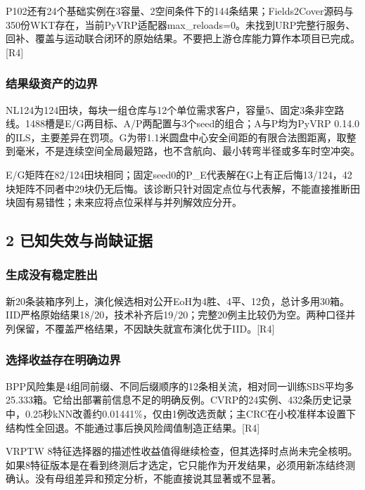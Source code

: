 \documentclass[11pt,a4paper]{article}
\newcommand{\bodytext}[1]{#1\par}
\begin{document}
\endgroup
\bodytext{P102还有24个基础实例在3容量、2空间条件下的144条结果；Fields2Cover源码与350份WKT存在，当前PyVRP适配器max\_\allowbreak{}reloads=0。未找到URP完整行服务、回补、覆盖与运动联合闭环的原始结果。不要把上游仓库能力算作本项目已完成。[R4]}
\subsubsection{结果级资产的边界}
\bodytext{NL124为124田块，每块一组仓库与12个单位需求客户，容量5、固定3条非空路线。1488槽是E/\allowbreak{}G两目标、A/\allowbreak{}P两配置与3个seed的组合；A与P均为PyVRP 0.14.0的ILS，主要差异在罚项。G为带1.1米圆盘中心安全间距的有限合法图距离，取整到毫米，不是连续空间全局最短路，也不含航向、最小转弯半径或多车时空冲突。}
\bodytext{E/\allowbreak{}G矩阵在82/\allowbreak{}124田块相同；固定seed0的P\_\allowbreak{}E代表解在G上有正后悔13/\allowbreak{}124，42块矩阵不同者中29块仍无后悔。该诊断只针对固定点位与代表解，不能直接推断田块固有易错性；未来应将点位采样与并列解效应分开。}
\subsection{2  已知失效与尚缺证据}
\subsubsection{生成没有稳定胜出}
\bodytext{新20条装箱序列上，演化候选相对公开EoH为4胜、4平、12负，总计多用30箱。IID严格原始结果18/\allowbreak{}20，技术补齐后19/\allowbreak{}20；完整20例主比较仍为空。两种口径并列保留，不覆盖严格结果，不因缺失就宣布演化优于IID。[R4]}
\subsubsection{选择收益存在明确边界}
\bodytext{BPP风险集是4组同前缀、不同后缀顺序的12条相关流，相对同一训练SBS平均多25.333箱。它给出部署前信息不足的明确反例。CVRP的24实例、432条历史记录中，0.25秒kNN改善约0.01441\%，仅由1例改选贡献；主CRC在小校准样本设置下结构性全回退。不能通过事后换风险阈值制造正结果。[R4]}
\bodytext{VRPTW 8特征选择器的描述性收益值得继续检查，但其选择时点尚未完全核明。如果8特征版本是在看到终测后才选定，它只能作为开发结果，必须用新冻结终测确认。没有母组差异和预定分析，不能直接说其显著或不显著。}
\end{document}
